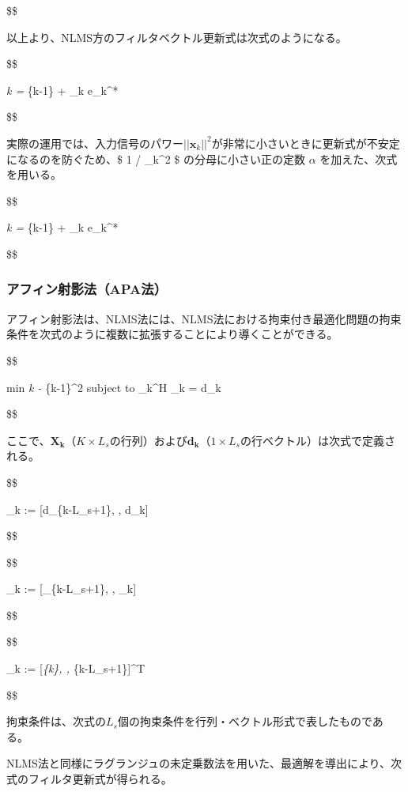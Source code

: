 \$\$

以上より、NLMS方のフィルタベクトル更新式は次式のようになる。

\$\$

\emph{k = }\{k-1\} + \lambda {}
\_k e\_k\^{}*

\$\$

実際の運用では、入力信号のパワー\(||\bm{x}_k||^2\)が非常に小さいときに更新式が不安定になるのを防ぐため、\$
1 / \textbar\textbar{}\_k\textbar\textbar\^{}2 \$
の分母に小さい正の定数 \(\alpha\) を加えた、次式を用いる。

\$\$

\emph{k = }\{k-1\} +
\lambda {} \_k e\_k\^{}*

\$\$

\hypertarget{ux30a2ux30d5ux30a3ux30f3ux5c04ux5f71ux6cd5apaux6cd5}{%
\subsubsection{アフィン射影法（APA法）}\label{ux30a2ux30d5ux30a3ux30f3ux5c04ux5f71ux6cd5apaux6cd5}}

アフィン射影法は、NLMS法には、NLMS法における拘束付き最適化問題の拘束条件を次式のように複数に拡張することにより導くことができる。

\$\$

min \textbar\textbar{}\emph{k -
}\{k-1\}\textbar\textbar\^{}2 subject to \_k\^{}H \_k
= d\_k

\$\$

ここで、\(\bm{X_k}\)（\(K \times L_s\)の行列）および\(\bm{d_k}\)（\(1 \times L_s\)の行ベクトル）は次式で定義される。

\$\$

\_k := {[}d\_\{k-L\_s+1\}, \cdots, d\_k{]}

\$\$

\$\$

\_k := {[}\_\{k-L\_s+1\}, \cdots, \_k{]}

\$\$

\$\$

\_k := {[}\emph{\{k\}, \cdots, }\{k-L\_s+1\}{]}\^{}T

\$\$

拘束条件は、次式の\(L_s\)個の拘束条件を行列・ベクトル形式で表したものである。

NLMS法と同様にラグランジュの未定乗数法を用いた、最適解を導出により、次式のフィルタ更新式が得られる。

